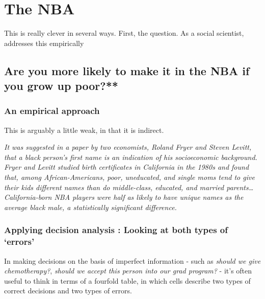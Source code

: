 \documentclass[]{book}
\theoremstyle{definition}
\theoremstyle{definition}
\theoremstyle{definition}
\theoremstyle{remark}
\begin{document}
\section{The NBA}\label{the-nba}

This is really clever in several ways. First, the question. As a social
scientist, \citet{stephens2017everybody} addresses this empirically

\subsection{Are you more likely to make it in the NBA if you grow up
poor?**}\label{are-you-more-likely-to-make-it-in-the-nba-if-you-grow-up-poor}

\subsubsection{An empirical approach}\label{an-empirical-approach}

This is arguably a little weak, in that it is indirect.

\emph{It was suggested in a paper by two economists, Roland Fryer and
Steven Levitt, that a black person's first name is an indication of his
socioeconomic background. Fryer and Levitt studied birth certificates in
California in the 1980s and found that, among African-Americans, poor,
uneducated, and single moms tend to give their kids different names than
do middle-class, educated, and married parents\ldots{}California-born
NBA players were half as likely to have unique names as the average
black male, a statistically significant difference.}

\subsubsection{\texorpdfstring{Applying decision analysis : Looking at
both types of
`errors'}{Applying decision analysis : Looking at both types of errors}}\label{applying-decision-analysis-looking-at-both-types-of-errors}

In making decisions on the basis of imperfect information - such as
\emph{should we give chemotherapy?}, \emph{should we accept this person
into our grad program?} - it's often useful to think in terms of a
fourfold table, in which cells describe two types of correct decisions
and two types of errors.
\end{document}
